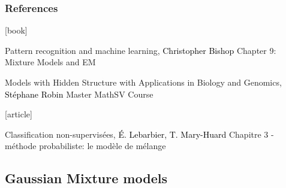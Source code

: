 \documentclass{beamer}\usepackage[]{graphicx}\usepackage[]{color}
\begin{document}
\begin{frame}
  \frametitle{References}

    \begin{thebibliography}{99}
      [book]

     Pattern recognition and machine learning,
    \newblock \textcolor{black}{Christopher Bishop}
    \newblock \alert{Chapter 9: Mixture Models and EM}

     Models with Hidden Structure with Applications in Biology and Genomics,
    \newblock \textcolor{black}{Stéphane Robin}
    \newblock \alert{Master MathSV Course}

      [article]

     Classification non-supervisées,
    \newblock \textcolor{black}{É. Lebarbier, T. Mary-Huard}
    \newblock \alert{Chapitre 3 - méthode probabiliste: le modèle de mélange}

    \end{thebibliography}


\end{frame}

\subsection{Gaussian Mixture models}
\end{document}
